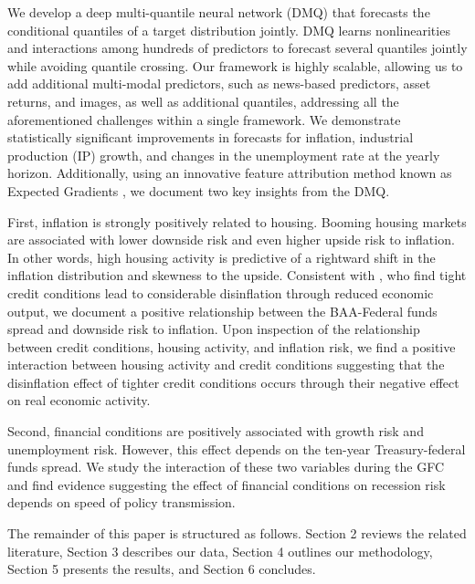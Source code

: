 \documentclass[12pt]{article}
\begin{document}
We develop a deep multi-quantile neural network (DMQ) that forecasts the conditional quantiles of a target distribution jointly. DMQ learns nonlinearities and interactions among hundreds of predictors to forecast several quantiles jointly while avoiding quantile crossing. Our framework is highly scalable, allowing us to add additional multi-modal predictors, such as news-based predictors, asset returns, and images, as well as additional quantiles, addressing all the aforementioned challenges within a single framework. We demonstrate statistically significant improvements in forecasts for inflation, industrial production (IP) growth, and changes in the unemployment rate at the yearly horizon. Additionally, using an innovative feature attribution method known as Expected Gradients \citep{erionImprovingPerformanceDeep2021}, we document two key insights from the DMQ. 

First, inflation is strongly positively related to housing. Booming housing markets are associated with lower downside risk and even higher upside risk to inflation. In other words, high housing activity is predictive of a rightward shift in the inflation distribution and skewness to the upside. Consistent with \cite{gilchristCreditSpreadsBusiness2012}, who find tight credit conditions lead to considerable disinflation through reduced economic output, we document a positive relationship between the BAA-Federal funds spread and downside risk to inflation. Upon inspection of the relationship between credit conditions, housing activity, and inflation risk, we find a positive interaction between housing activity and credit conditions suggesting that the disinflation effect of tighter credit conditions occurs through their negative effect on real economic activity.

Second, financial conditions are positively associated with growth risk and unemployment risk. However, this effect depends on the ten-year Treasury-federal funds spread. We study the interaction of these two variables during the GFC and find evidence suggesting the effect of financial conditions on recession risk depends on speed of policy transmission.  

The remainder of this paper is structured as follows. Section 2 reviews the related literature, Section 3 describes our data, Section 4 outlines our methodology, Section 5 presents the results, and Section 6 concludes.  

\end{document}
